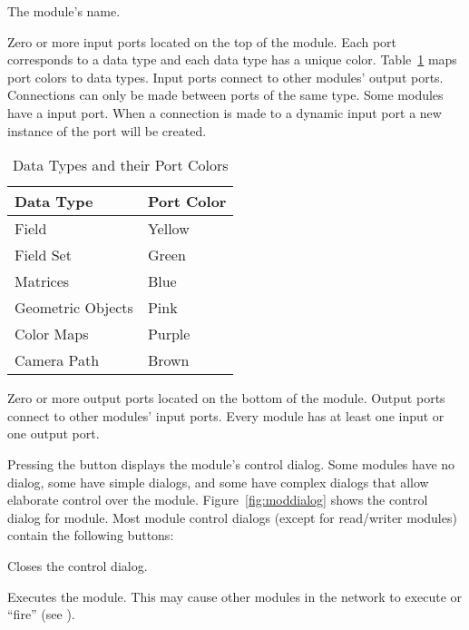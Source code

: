 \begin{description}
   The module's name.
  
   Zero or more input ports located on the top
  of the module.  Each port corresponds to a data type and each data
  type has a unique color.  Table~\ref{tab:portcolors} maps port
  colors to data types.  Input ports connect to other modules' output
  ports.  Connections can only be made between ports of the same type.
  Some modules have a  input port.  When a connection is
  made to a dynamic input port a new instance of the port will be
  created.

  \begin{table}[htbp]
    \begin{center}
      \begin{tabular}{|l|l|}
        \hline
        \textbf{Data Type} & \textbf{Port Color} \\
        \hline
        Field & Yellow \\
        Field Set & Green \\
        Matrices & Blue \\
        Geometric Objects & Pink \\
        Color Maps & Purple \\
        Camera Path & Brown \\
        \hline
      \end{tabular}
      \caption{Data Types and their Port Colors}
      \label{tab:portcolors}
    \end{center}
  \end{table}
  
   Zero or more output ports located on the
  bottom of the module.  Output ports connect to other modules' input
  ports.  Every module has  at least one input or one output
  port.
  
   Pressing the  button displays the
  module's control dialog. Some modules have no dialog, some have
  simple dialogs, and some have complex dialogs that allow elaborate
  control over the module.  Figure~\ref{fig:moddialog} shows the
  control dialog for  module.  Most module control
  dialogs (except for read/writer modules) contain the following
  buttons:

  \begin{description}
      Closes the control dialog.

     Executes the module.  This may cause other
    modules in the network to execute or ``fire'' (see
    ).
    

\end{description}
\end{description}
